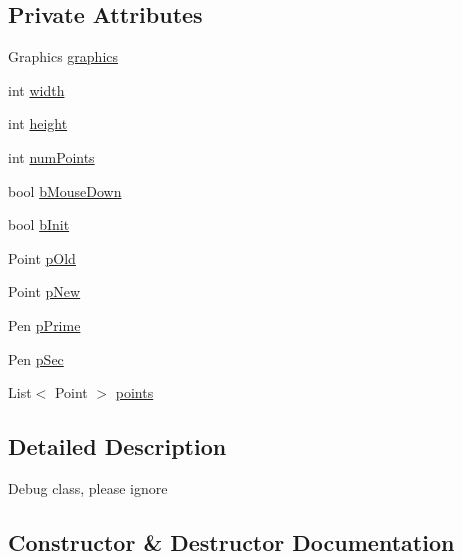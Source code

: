 \subsection*{Private Attributes}
\begin{DoxyCompactItemize}
\item 
Graphics \mbox{\hyperlink{class_paint___program_1_1_debug_tool_a6db0d9d72add267032949d331a12a017}{graphics}}
\item 
int \mbox{\hyperlink{class_paint___program_1_1_debug_tool_ac285e9144df5c4c82e634f39124b1e16}{width}}
\item 
int \mbox{\hyperlink{class_paint___program_1_1_debug_tool_a2180c8645eb505b2170305afd253fddd}{height}}
\item 
int \mbox{\hyperlink{class_paint___program_1_1_debug_tool_a9cbdfa82dccbfcecc88ec3d3d9bd8049}{num\+Points}}
\item 
bool \mbox{\hyperlink{class_paint___program_1_1_debug_tool_a7384ecc5d8dd4490f06cf6bd622986af}{b\+Mouse\+Down}}
\item 
bool \mbox{\hyperlink{class_paint___program_1_1_debug_tool_a58921b1790994eeb8c922bf63b55d429}{b\+Init}}
\item 
Point \mbox{\hyperlink{class_paint___program_1_1_debug_tool_a90d4f179237f1c374fe3302ae78a3c4c}{p\+Old}}
\item 
Point \mbox{\hyperlink{class_paint___program_1_1_debug_tool_ae2ed9bdde0db892b63d9db1da369de34}{p\+New}}
\item 
Pen \mbox{\hyperlink{class_paint___program_1_1_debug_tool_a1126df782657a290b3bc13b4168abe4e}{p\+Prime}}
\item 
Pen \mbox{\hyperlink{class_paint___program_1_1_debug_tool_a83f4b616dfa26be50768d1fa276f8906}{p\+Sec}}
\item 
List$<$ Point $>$ \mbox{\hyperlink{class_paint___program_1_1_debug_tool_aed4b47af45077ad5a83f88da6cad0620}{points}}
\end{DoxyCompactItemize}


\subsection{Detailed Description}
Debug class, please ignore 



\subsection{Constructor \& Destructor Documentation}
\mbox{\label{class_paint___program_1_1_debug_tool_a69b23aa29a8e6a7eda899f8b0c06a30a}} 
